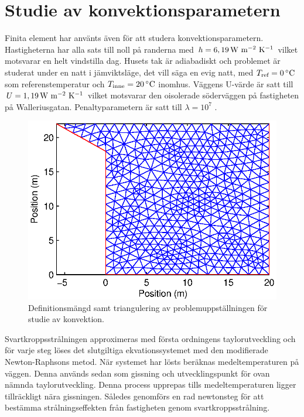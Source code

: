 \section{Studie av konvektionsparametern}

Finita element har använts även för att studera konvektionsparametern. Hastigheterna har alla
sats till noll på randerna med $h=\unit[6,19]{W~m^{-2}~K^{-1}}$ vilket motsvarar en helt vindstilla dag.
Husets tak är adiabadiskt
och problemet är studerat under en natt i jämviktsläge, det vill säga en evig natt, med
$T_\text{ref} = \unit[0]{^\circ C}$ som referenstemperatur och $T_\text{inne} = \unit[20]{^\circ C}$ inomhus.
Väggens U-värde är satt till $U = \unit[1,19]{W~m^{-2}~K^{-1}}$ vilket motsvarar den oisolerade söderväggen på fastigheten på Walleriusgatan. Penaltyparametern är satt till $\lambda = 10^7$ \emph{\color{Enhet på penaltyparametern}}.

\begin{figure}
\centering
\includegraphics{images/triconvec.eps}
\caption{Definitionsmängd samt triangulering av problemuppställningen för studie av konvektion.}
\end{figure}

Svartkroppsstrålningen approximeras med första ordningens taylorutveckling och
för varje steg löses det slutgiltiga ekvationssystemet med den
modifierade Newton-Raphsons metod. När systemet har lösts beräknas
medeltemperaturen på väggen. Denna används sedan som gissning och utvecklingspunkt
för ovan nämnda taylorutveckling. Denna process upprepas tills medeltemperaturen
ligger tillräckligt nära gissningen. Således genomförs en rad newtonsteg
för att bestämma strålningseffekten från fastigheten genom svartkroppsstrålning.

